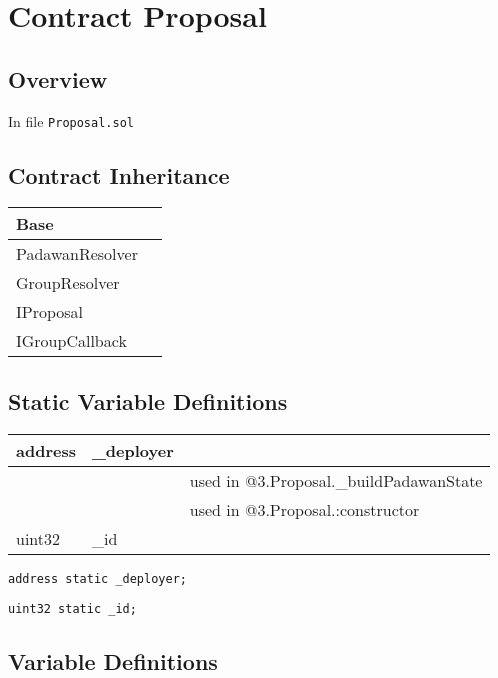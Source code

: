 
\chapter{Contract Proposal}

\minitoc

\section{Overview}


In file {\tt Proposal.sol}

\section{Contract Inheritance}


\noindent\begin{tabular}{|l|p{5cm}|}\hline
Base & \\\hline
PadawanResolver & \\\hline
GroupResolver & \\\hline
IProposal & \\\hline
IGroupCallback & \\\hline
\end{tabular}


\section{Static Variable Definitions}


\ifsoltables
\noindent\begin{tabular}{|l|l|p{5cm}|}\hline
address & \_{}deployer &  \\\hline
 & & used in @3.Proposal.\_{}buildPadawanState\\\hline
 & & used in @3.Proposal.:constructor\\\hline
uint32 & \_{}id &  \\\hline
\end{tabular}
\fi


\begin{lstlisting}[firstnumber=15]
    address static _deployer;
\end{lstlisting}

\begin{lstlisting}[firstnumber=16]
    uint32 static _id;
\end{lstlisting}

\section{Variable Definitions}


